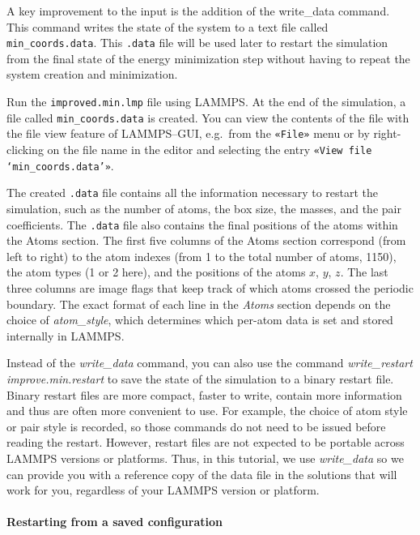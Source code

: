 \documentclass[9pt,tutorial]{livecoms}
\newcommand{\lmpcmd}[1]{\hspace{0pt}\colorbox{listing}{\textcolor{command}{\small{#1}}}\hspace{0pt}} %
\newcommand{\flecmd}[1]{\textcolor{command}{\texttt{#1}}} %
\newcommand{\guicmd}[1]{\textcolor{command}{\texttt{«#1»}}} %
\begin{document}
A key improvement to the input is the addition of the
\lmpcmd{write\_data} command.  This command writes the state
of the system to a text file called \flecmd{min\_coords.data}.
This \flecmd{.data} file will be used later
to restart the simulation from the final state of the energy
minimization step without having to repeat the system creation and
minimization.

Run the \flecmd{improved.min.lmp} file using LAMMPS.  At the end of the simulation, a file
called \flecmd{min\_coords.data} is created.  You can view the contents
of the file with the file view feature of LAMMPS--GUI, e.g.~from the
\guicmd{File} menu or by right-clicking on the file name in the editor
and selecting the entry \guicmd{View file `min\_coords.data'}.

The created \flecmd{.data} file contains all the information necessary to
restart the simulation, such as the number of atoms, the box size, the
masses, and the pair coefficients.  The
\flecmd{.data} file also contains the final
positions of the atoms within the \lmpcmd{Atoms} section.  The first five
columns of the \lmpcmd{Atoms} section correspond (from left to right) to
the atom indexes (from 1 to the total number of atoms, 1150), the atom
types (1 or 2 here), and the positions of the atoms $x$, $y$, $z$.  The
last three columns are image flags that keep track of which atoms
crossed the periodic boundary.  The exact format of each line in the
\textit{Atoms} section depends on the choice of \textit{atom\_style}, which
determines which per-atom data is set and stored internally in LAMMPS.

\begin{note}
  Instead of the \textit{write\_data} command, you can also use the
  command \textit{write\_restart improve.min.restart} to save the state
  of the simulation to a binary restart file.  Binary restart files are
  more compact, faster to write, contain more information and thus are
  often more convenient to use.  For example, the choice of atom style
  or pair style is recorded, so those commands do not need to be issued
  before reading the restart.  However, restart files are not expected to be
  portable across LAMMPS versions or platforms.  Thus, in this tutorial,
  we use \textit{write\_data} so we can provide you with a reference
  copy of the data file in the solutions that will work for you,
  regardless of your LAMMPS version or platform.
\end{note}

\paragraph{Restarting from a saved configuration}
\end{document}
